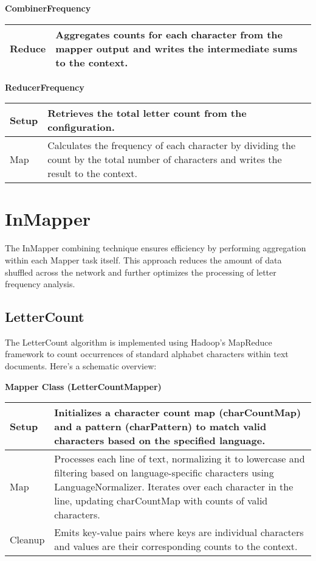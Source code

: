 \textbf{CombinerFrequency}
\begin{longtable}{|>{\raggedright\arraybackslash}p{}|>{\raggedright\arraybackslash}p{}|}
    \hline
    Reduce & Aggregates counts for each character from the mapper output and writes the intermediate sums to the context.\\
    \hline
\end{longtable}

\textbf{ReducerFrequency}
\begin{longtable}{|>{\raggedright\arraybackslash}p{}|>{\raggedright\arraybackslash}p{}|}
    \hline
    Setup & Retrieves the total letter count from the configuration. \\
    \hline
    Map & Calculates the frequency of each character by dividing the count by the total number of characters and writes the result to the context.\\
    \hline
\end{longtable}



\section{InMapper}
The InMapper combining technique ensures efficiency by performing aggregation within each Mapper task itself. This approach reduces the amount of data shuffled across the network and further optimizes the processing of letter frequency analysis.


\subsection{LetterCount}

The LetterCount algorithm is implemented using Hadoop's MapReduce framework to count occurrences of standard alphabet characters within text documents. Here’s a schematic overview:


\textbf{Mapper Class (LetterCountMapper)}
\begin{longtable}{|>{\raggedright\arraybackslash}p{}|>{\raggedright\arraybackslash}p{}|}
    \hline
    Setup & Initializes a character count map (charCountMap) and a pattern (charPattern) to match valid characters based on the specified language. \\
    \hline
    Map & Processes each line of text, normalizing it to lowercase and filtering based on language-specific characters using LanguageNormalizer. Iterates over each character in the line, updating charCountMap with counts of valid characters. \\
    \hline
    Cleanup & Emits key-value pairs where keys are individual characters and values are their corresponding counts to the context. \\
    \hline
\end{longtable}


